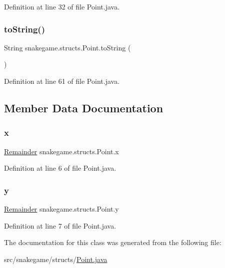 Definition at line 32 of file Point.\+java.

\mbox{\label{classsnakegame_1_1structs_1_1_point_aec9ad3287697d952ab40687f5459241b}} 
\subsubsection{\texorpdfstring{to\+String()}{toString()}}
{\footnotesize\ttfamily String snakegame.\+structs.\+Point.\+to\+String (\begin{DoxyParamCaption}{ }\end{DoxyParamCaption})}



Definition at line 61 of file Point.\+java.



\subsection{Member Data Documentation}
\mbox{\label{classsnakegame_1_1structs_1_1_point_acf6c91ee7cda0e65a8054ff0dc07b79a}} 
\subsubsection{\texorpdfstring{x}{x}}
{\footnotesize\ttfamily \mbox{\hyperlink{classsnakegame_1_1structs_1_1_remainder}{Remainder}} snakegame.\+structs.\+Point.\+x\hspace{0.3cm}{\ttfamily [protected]}}



Definition at line 6 of file Point.\+java.

\mbox{\label{classsnakegame_1_1structs_1_1_point_a2a9fe55d9cf57dbc120bbce39313d38d}} 
\subsubsection{\texorpdfstring{y}{y}}
{\footnotesize\ttfamily \mbox{\hyperlink{classsnakegame_1_1structs_1_1_remainder}{Remainder}} snakegame.\+structs.\+Point.\+y\hspace{0.3cm}{\ttfamily [protected]}}



Definition at line 7 of file Point.\+java.



The documentation for this class was generated from the following file\+:\begin{DoxyCompactItemize}
\item 
src/snakegame/structs/\mbox{\hyperlink{_point_8java}{Point.\+java}}\end{DoxyCompactItemize}
